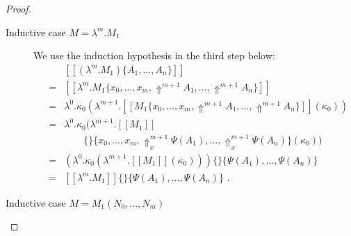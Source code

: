 \documentclass[a4paper,11pt,draft]{article}
\begin{document}
\begin{proof}
\begin{description}
\item[\sffamily Inductive case $M = \lambda^{m}.M_{1}$]\hfill

  We use the induction hypothesis in the third step below:
  \begin{eqnarray*} %
    &   & [\![(\lambda^{m}.M_{1})\{A_{1}, \ldots, A_{n}\}]\!] \\
    & = & [\![\lambda^{m}.M_{1}\{x_{0}, \ldots, x_{m}, \Uparrow^{m+1}A_{1}, \ldots, \Uparrow^{m+1}A_{n}\}]\!] \\
    & = & \lambda^{0}.\kappa_{0}(\lambda^{m+1}.[\![M_{1}\{x_{0}, \ldots, x_{m}, \Uparrow^{m+1}A_{1}, \ldots, \Uparrow^{m+1}A_{n}\}]\!](\kappa_{0})) \\
    & = & \lambda^{0}.\kappa_{0}(\lambda^{m+1}.[\![M_{1}]\!] \\
    &   & \qquad \{\}\{x_{0}, \ldots, x_{m}, \Uparrow_{x}^{m+1}\Psi(A_{1}), \ldots, \Uparrow_{x}^{m+1}\Psi(A_{n})\}(\kappa_{0})) \\
    & = & (\lambda^{0}.\kappa_{0}(\lambda^{m+1}.[\![M_{1}]\!](\kappa_{0})))\{\}\{\Psi(A_{1}), \ldots, \Psi(A_{n})\} \\
    & = & [\![\lambda^{m}.M_{1}]\!]\{\}\{\Psi(A_{1}), \ldots, \Psi(A_{n})\} \text{ .}
  \end{eqnarray*}

\item[\sffamily Inductive case $M = M_{1}(N_{0}, \ldots, N_{m})$]\hfill


\end{description}
\end{proof}
\end{document}
